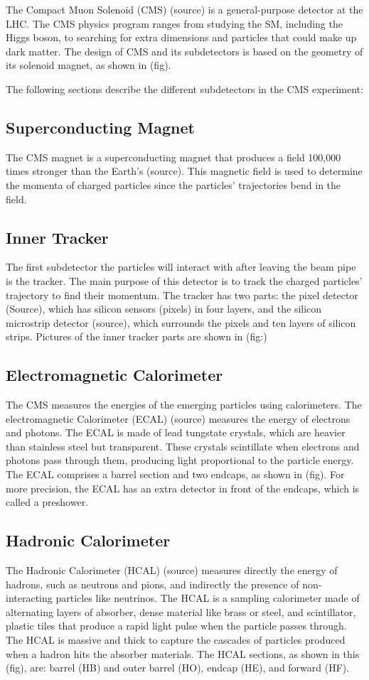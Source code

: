 The Compact Muon Solenoid (CMS) (source) is a general-purpose detector at the LHC. The CMS physics program ranges from studying the SM, including the Higgs boson, to searching for extra dimensions and particles that could make up dark matter. The design of CMS and its subdetectors is based on the geometry of its solenoid magnet, as shown in (fig). 
 
The following sections describe the different subdetectors in the CMS experiment:     


\subsection{Superconducting Magnet} 
The CMS magnet is a superconducting magnet that produces a field 100,000 times stronger than the Earth's (source). This magnetic field is used to determine the momenta of charged particles since the particles' trajectories bend in the field.

\subsection{Inner Tracker} 
The first subdetector the particles will interact with after leaving the beam pipe is the tracker. The main purpose of this detector is to track the charged particles' trajectory to find their momentum. The tracker has two parts: the pixel detector (Source), which has silicon sensors (pixels) in four layers, and the silicon microstrip detector (source), which surrounds the pixels and ten layers of silicon strips. Pictures of the inner tracker parts are shown in (fig:)

\subsection{Electromagnetic Calorimeter}
The CMS measures the energies of the emerging particles using calorimeters. The electromagnetic Calorimeter (ECAL) (source) measures the energy of electrons and photons. The ECAL is made of lead tungstate crystals, which are heavier than stainless steel but transparent. These crystals scintillate when electrons and photons pass through them, producing light proportional to the particle energy. The ECAL comprises a barrel section and two endcaps, as shown in (fig). For more precision, the ECAL has an extra detector in front of the endcaps, which is called a preshower.

\subsection{Hadronic Calorimeter}
The Hadronic Calorimeter (HCAL) (source) measures directly the energy of hadrons, such as neutrons and pions, and indirectly the presence of non-interacting particles like neutrinos. The HCAL is a sampling calorimeter made of alternating layers of absorber, dense material like brass or steel, and scintillator, plastic tiles that produce a rapid light pulse when the particle passes through. The HCAL is massive and thick to capture the cascades of particles produced when a hadron hits the absorber materials. The HCAL sections, as shown in this (fig), are: barrel (HB) and outer barrel (HO), endcap (HE), and forward (HF). 

